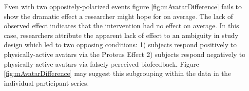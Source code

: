 Even with two oppositely-polarized events figure \ref{fig:mAvatarDifference} fails to show the dramatic effect a researcher might hope for on average.
The lack of observed effect indicates that the intervention had no effect on average.
In this case, researchers attribute the apparent lack of effect to an ambiguity in study design which led to two opposing conditions: 1) subjects respond positively to physically-active avatars via the Proteus Effect \cite{yee2009proteus} 2) subjects respond negatively to physically-active avatars via falsely perceived biofeedback.
Figure \ref{fig:mAvatarDifference} may suggest this subgrouping within the data in the individual participant series.

